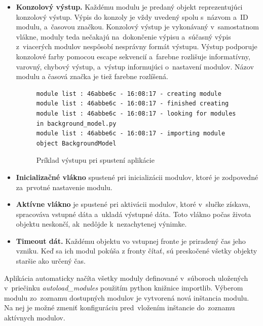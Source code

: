 \begin{itemize}
                \item \textbf{Konzolový výstup.} Každému modulu je predaný objekt reprezentujúci konzolový výstup. Výpis do konzoly je vždy uvedený spolu s~názvom a~ID modulu, a~časovou značkou. Konzolový výstup je vykonávaný v~samostatnom vlákne, moduly teda nečakajú na~dokončenie výpisu a~súčasný výpis z~viacerých modulov nespôsobí nesprávny formát výstupu. Výstup podporuje konzolové farby pomocou escape sekvencií a~farebne rozlišuje informatívny, varovný, chybový výstup, a~výstup informujúci o~nastavení modulov. Názov modulu a časová značka je tiež farebne rozlíšená.
                \begin{figure}[H]
                    \centering
                    \begin{lstlisting}
module list : 46abbe6c - 16:08:17 - creating module
module list : 46abbe6c - 16:08:17 - finished creating
module list : 46abbe6c - 16:08:17 - looking for modules
in background_model.py
module list : 46abbe6c - 16:08:17 - importing module
object BackgroundModel
                    \end{lstlisting}
                    \caption{Príklad výstupu pri spustení aplikácie}
                \end{figure}
                \item \textbf{Inicializačné vlákno} spustené pri inicializácii modulov, ktoré je zodpovedné za~prvotné nastavenie modulu.
                \item \textbf{Aktívne vlákno} je spustené pri aktivácii modulov, ktoré v~slučke získava, spracováva vstupné dáta a~ukladá výstupné dáta. Toto vlákno počas života objektu neskončí, ak~nedôjde k~nezachytenej výnimke.
                \item \textbf{Timeout dát.} Každému objektu vo vstupnej fronte je priradený čas jeho vzniku. Keď sa ich modul pokúša z fronty čítať, sú preskočené všetky objekty staršie ako určený čas.
            \end{itemize}

            Aplikácia automaticky načíta všetky moduly definované v~súboroch uložených v~priečinku \emph{autoload\_modules} použitím python knižnice importlib. Výberom modulu zo~zoznamu dostupných modulov je vytvorená nová inštancia modulu. Na nej je možné zmeniť konfiguráciu pred~vložením inštancie do~zoznamu aktívnych modulov.

